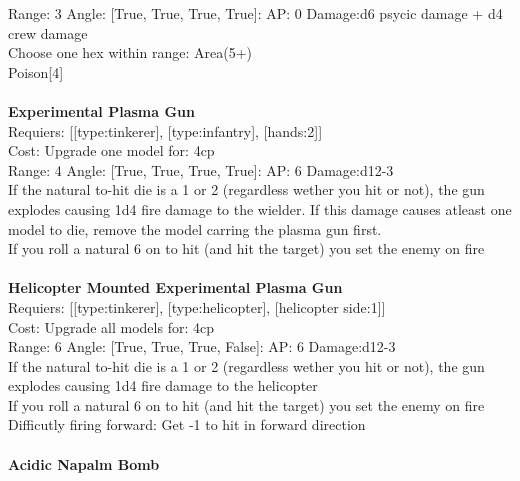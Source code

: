 Range: 3  Angle: [True, True, True, True]: AP: 0 Damage:d6 psycic damage + d4 crew damage \\
Choose one hex within range: Area(5+)\\ 
Poison[4]\\ 








\ \\
{\bf Experimental Plasma Gun } \\

Requiers: [[type:tinkerer], [type:infantry], [hands:2]] \\
Cost: Upgrade one model for: 4cp \\


Range: 4  Angle: [True, True, True, True]: AP: 6 Damage:d12-3 \\
If the natural to-hit die is a 1 or 2 (regardless wether you hit or not), the gun explodes causing 1d4 fire damage to the wielder. If this damage causes atleast one model to die, remove the model carring the plasma gun first.\\ 
If you roll a natural 6 on to hit (and hit the target) you set the enemy on fire\\ 








\ \\
{\bf Helicopter Mounted Experimental Plasma Gun } \\

Requiers: [[type:tinkerer], [type:helicopter], [helicopter side:1]] \\
Cost: Upgrade all models for: 4cp \\


Range: 6  Angle: [True, True, True, False]: AP: 6 Damage:d12-3 \\
If the natural to-hit die is a 1 or 2 (regardless wether you hit or not), the gun explodes causing 1d4 fire damage to the helicopter\\ 
If you roll a natural 6 on to hit (and hit the target) you set the enemy on fire\\ 
Difficutly firing forward: Get -1 to hit in forward direction\\ 








\ \\
{\bf Acidic Napalm Bomb } \\

